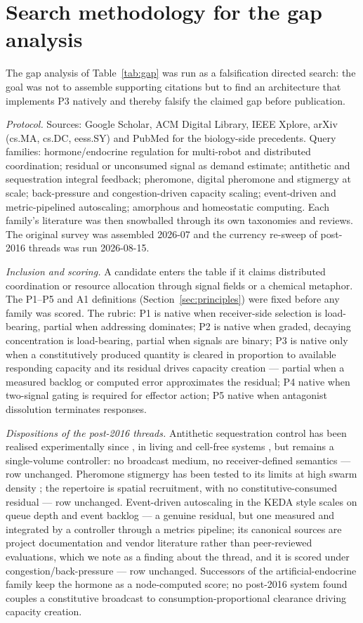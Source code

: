 \documentclass[twoside,twocolumn,usenatbib]{mnras}
\begin{document}
\appendix

\section{Search methodology for the gap analysis}
\label{app:search}

The gap analysis of Table~\ref{tab:gap} was run as a falsification
directed search: the goal was not to assemble supporting citations but
to find an architecture that implements P3 natively and thereby
falsify the claimed gap before publication.

\emph{Protocol.} Sources: Google Scholar, ACM Digital Library, IEEE
Xplore, arXiv (cs.MA, cs.DC, eess.SY) and PubMed for the
biology-side precedents. Query families: hormone/endocrine regulation
for multi-robot and distributed coordination; residual or unconsumed
signal as demand estimate; antithetic and sequestration integral
feedback; pheromone, digital pheromone and stigmergy at scale;
back-pressure and congestion-driven capacity scaling; event-driven and
metric-pipelined autoscaling; amorphous and homeostatic computing.
Each family's literature was then snowballed through its own
taxonomies and reviews. The original survey was assembled 2026-07 and
the currency re-sweep of post-2016 threads was run 2026-08-15.

\emph{Inclusion and scoring.} A candidate enters the table if it
claims distributed coordination or resource allocation through signal
fields or a chemical metaphor. The P1--P5 and A1 definitions
(Section~\ref{sec:principles}) were fixed before any family was
scored. The rubric: P1 is native when receiver-side selection is
load-bearing, partial when addressing dominates; P2 is native when
graded, decaying concentration is load-bearing, partial when signals
are binary; P3 is native only when a constitutively produced quantity
is cleared in proportion to available responding capacity and its
residual drives capacity creation --- partial when a measured backlog
or computed error approximates the residual; P4 native when two-signal
gating is required for effector action; P5 native when antagonist
dissolution terminates responses.

\emph{Dispositions of the post-2016 threads.} Antithetic
sequestration control has been realised experimentally since
\citet{briat2016}, in living and cell-free systems \citep{aoki2019},
but remains a single-volume controller: no broadcast medium, no
receiver-defined semantics --- row unchanged. Pheromone stigmergy has
been tested to its limits at high swarm density \citep{hunt2019};
the repertoire is spatial recruitment, with no constitutive-consumed
residual --- row unchanged. Event-driven autoscaling in the KEDA style
scales on queue depth and event backlog --- a genuine residual, but
one measured and integrated by a controller through a metrics
pipeline; its canonical sources are project documentation and vendor
literature rather than peer-reviewed evaluations, which we note as a
finding about the thread, and it is scored under congestion/back-pressure ---
row unchanged. Successors of the artificial-endocrine family keep the
hormone as a node-computed score; no post-2016 system found couples a
constitutive broadcast to consumption-proportional clearance driving
capacity creation.
\end{document}
